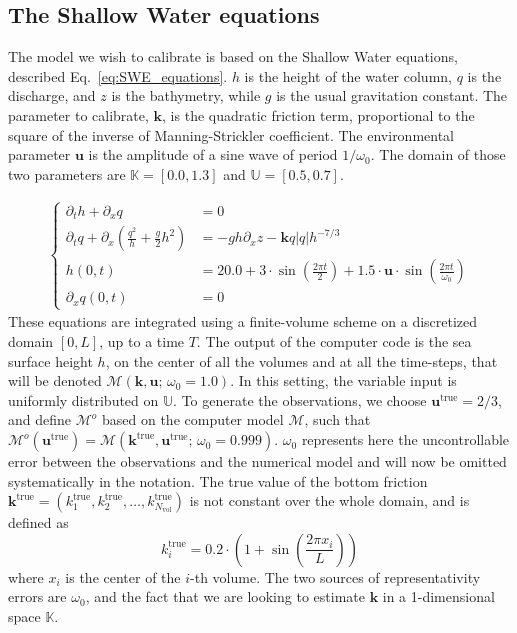 \documentclass[preprint, 1p]{elsarticle}
\newcommand{\Kspace}{\mathbb{K}}
\newcommand{\Uspace}{\mathbb{U}}
\begin{document}
\subsection{The Shallow Water equations}

The model we wish to calibrate is based on the Shallow Water equations, described Eq.~\eqref{eq:SWE_equations}. $h$ is the height of the water column, $q$ is the discharge, and $z$ is the bathymetry, while $g$ is the usual gravitation constant. The parameter to calibrate, $\mathbf{k}$, is the quadratic friction term, proportional to the square of the inverse of Manning-Strickler coefficient. The environmental parameter $\mathbf{u}$ is the amplitude of a sine wave of period $1/\omega_0$. The domain of those two parameters are $\Kspace = [0.0, 1.3]$ and $\Uspace = [0.5, 0.7]$.


\begin{align}
  \label{eq:SWE_equations}
  \left\{
    \begin{array}{rl}
      \partial_t h + \partial_x q &= 0 \\
      \partial_t q + \partial_x \left(\frac{q^2}{h} + \frac{g}{2}h^2\right) &= - gh\partial_x z - \mathbf{k}q |q|h^{-7/3} \\
      h(0, t) &= 20.0 + 3\cdot \sin \left(\frac{2\pi t}{2}\right) + 1.5\cdot \mathbf{u} \cdot \sin\left(\frac{2 \pi t}{\omega_0}\right)\\
      \partial_x q(0, t) &= 0
      \end{array}
  \right.
\end{align}
These equations are integrated using a finite-volume scheme on a discretized domain $[0, L]$, up to a time $T$. The output of the computer code is the sea surface height $h$, on the center of all the volumes and at all the time-steps, that will be denoted $\mathcal{M}(\mathbf{k},\mathbf{u};\, \omega_0=1.0)$.
In this setting, the variable input is uniformly distributed on $\Uspace$.
To generate the observations, we choose $\mathbf{u}^{\mathrm{true}}=2/3$, and define $\mathcal{M}^o$ based on the computer model $\mathcal{M}$, such that $\mathcal{M}^o(\mathbf{u}^{\mathrm{true}}) = \mathcal{M}(\mathbf{k}^{\mathrm{true}}, \mathbf{u}^{\mathrm{true}}; \, \omega_0 = 0.999)$. $\omega_0$  
represents here the uncontrollable error between the observations and the numerical model and will now be omitted systematically in the notation. The true value of the bottom friction $\mathbf{k}^{\mathrm{true}} = (k_1^{\mathrm{true}}, k_2^{\mathrm{true}},\dots, k_{N_\mathrm{vol}}^{\mathrm{true}})$ is not constant over the whole domain, and is defined as
\begin{equation*}
{k}^{\mathrm{true}}_i = 0.2\cdot \left(1 + \sin\left(\frac{2 \pi x_i}{L}\right)\right)
\end{equation*}
where $x_i$ is the center of the $i$-th volume. The two sources of representativity errors are $\omega_0$, and the fact that we are looking to estimate $\mathbf{k}$ in a 1-dimensional space $\Kspace$. 
\end{document}
